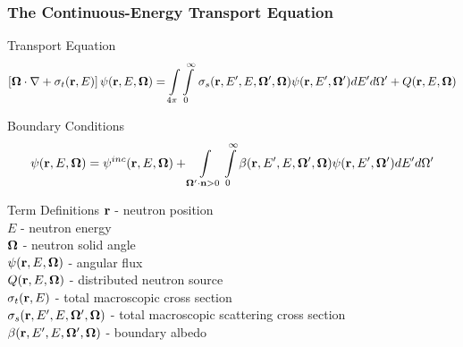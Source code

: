 \documentclass[compress,10pt]{beamer}
\renewcommand{\vec}[1]{\mathbf{#1}}
\begin{document}
\begin{frame}[t]\frametitle{The Continuous-Energy Transport Equation} \vspace{-2.5mm}
\begin{block}{Transport Equation}{\footnotesize
\begin{equation*}
\left[ { \bf \Omega} \cdot {\bf \nabla}  + \sigma_t ({\bf r}, E) \right] \psi ({\bf r}, E, {\bf \Omega}) = \int\displaylimits_{4 \pi} \int\displaylimits_{0}^{\infty}  \, \sigma_s ({\bf r}, E' , E, {\bf \Omega}' , {\bf \Omega}) \psi ({\bf r}, E', {\bf \Omega}') d E'  d \Omega'+ Q ({\bf r}, E, {\bf \Omega})
\end{equation*}
}\end{block} \vspace{-1.0mm}
\begin{block}{Boundary Conditions}{\footnotesize
\begin{equation*}
\psi ({\bf r}, E, {\bf \Omega}) = \psi^{inc} ({\bf r}, E, {\bf \Omega}) +  \int\displaylimits_{\vec{\Omega}' \cdot \vec{n} > 0} \int\displaylimits_{0}^{\infty} \beta ({\bf r}, E' , E, {\bf \Omega}' , {\bf \Omega}) \psi ({\bf r}, E', {\bf \Omega}') d E'  d \Omega'
\end{equation*}
}\end{block} \vspace{-1.0mm}
\begin{block}{Term Definitions} {\footnotesize
${\bf r}$ -  neutron position \\
$E$ -  neutron energy \\
${\bf \Omega}$ - neutron solid angle \\
$\psi  ({\bf r}, E, {\bf \Omega})$ - angular flux  \\
$Q  ({\bf r}, E, {\bf \Omega})$ - distributed neutron source \\
$\sigma_t ({\bf r}, E)$ - total macroscopic cross section \\
$\sigma_s ({\bf r}, E' , E, {\bf \Omega}' , {\bf \Omega})$ - total macroscopic scattering cross section\\
$\beta ({\bf r}, E' , E, {\bf \Omega}' , {\bf \Omega})$ - boundary albedo 
}\end{block}
\end{frame}
\end{document}
